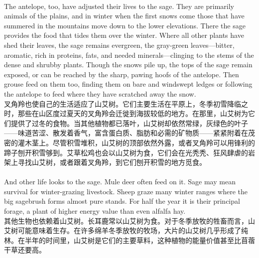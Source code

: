 \documentclass{article}
\begin{document}
\\
The antelope, too, have adjusted their lives to the sage. They are primarily animals of the plains, and in winter when the first snows come those that have summered in the mountains move down to the lower elevations. There the sage provides the food that tides them over the winter. Where all other plants have shed their leaves, the sage remains evergreen, the gray-green leaves—bitter, aromatic, rich in proteins, fats, and needed minerals—clinging to the stems of the dense and shrubby plants. Though the snows pile up, the tops of the sage remain exposed, or can be reached by the sharp, pawing hoofs of the antelope. Then grouse feed on them too, finding them on bare and windswept ledges or following the antelope to feed where they have scratched away the snow.\\
叉角羚也使自己的生活适应了山艾树。它们主要生活在平原上，冬季初雪降临之时，那些在山区度过夏天的叉角羚会迁徙到海拔较低的地方。在那里，山艾树为它们提供了过冬的食物。当其他植物都已落叶，山艾树却依然常绿，灰绿色的叶子——味道苦涩、散发着香气，富含蛋白质、脂肪和必需的矿物质——紧紧附着在茂密的灌木茎上。尽管积雪堆积，山艾树的顶部依然外露，或者叉角羚可以用锋利的蹄子刨开积雪够到。艾草松鸡也会以山艾树为食，它们会在光秃秃、狂风肆虐的岩架上寻找山艾树，或者跟着叉角羚，到它们刨开积雪的地方觅食。 \\

\\
And other life looks to the sage. Mule deer often feed on it. Sage may mean survival for winter-grazing livestock. Sheep graze many winter ranges where the big sagebrush forms almost pure stands. For half the year it is their principal forage, a plant of higher energy value than even alfalfa hay.\\
其他生物也依赖着山艾树。长耳鹿常以山艾树为食。对于冬季放牧的牲畜而言，山艾树可能意味着生存。在许多绵羊冬季放牧的牧场，大片的山艾树几乎形成了纯林。在半年的时间里，山艾树是它们的主要草料，这种植物的能量价值甚至比苜蓿干草还要高。 \\
\end{document}
